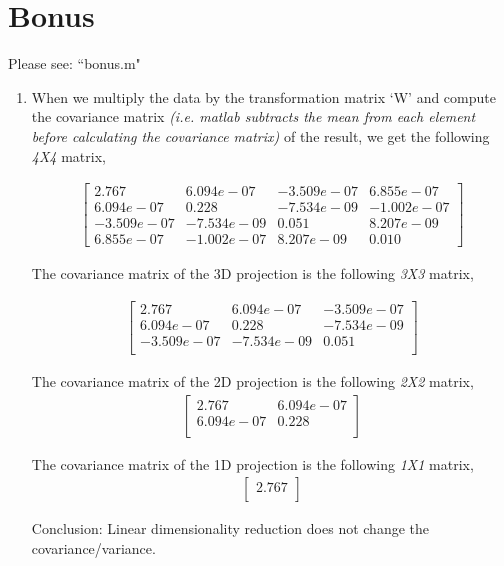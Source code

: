 \documentclass[a4paper]{article}
\begin{document}
\section*{Bonus}

Please see: ``bonus.m" \newline

\begin{enumerate}
	\item[] When we multiply the data by the transformation matrix `W' and compute the covariance matrix \textit{(i.e. matlab subtracts the mean from each element before calculating the covariance matrix)} of the result, we get the following \textit{4X4} matrix,

\begin{align*}
	\begin{bmatrix}
		2.767 &	6.094e-07 & -3.509e-07	& 6.855e-07 \\
		6.094e-07 & 0.228	& -7.534e-09 & -1.002e-07 \\
		-3.509e-07 & -7.534e-09 & 0.051	& 8.207e-09 \\
		6.855e-07 & -1.002e-07 & 8.207e-09 & 0.010 
	\end{bmatrix}
\end{align*}
	\newline
	
The covariance matrix of the 3D projection is the following \textit{3X3} matrix,

\begin{align*}
	\begin{bmatrix}
		2.767 &	6.094e-07 & -3.509e-07 \\
		6.094e-07 & 0.228	& -7.534e-09 \\
		-3.509e-07 & -7.534e-09 & 0.051 \\ 
	\end{bmatrix}
\end{align*}
\newline

The covariance matrix of the 2D projection is the following \textit{2X2} matrix,
\begin{align*}
	\begin{bmatrix}
		2.767 &	6.094e-07 \\
		6.094e-07 & 0.228 \\
	\end{bmatrix}
\end{align*}
\newline


The covariance matrix of the 1D projection is the following \textit{1X1} matrix,
\begin{align*}
	\begin{bmatrix}
		2.767 \\
	\end{bmatrix}
\end{align*}
\newline

Conclusion: Linear dimensionality reduction does not change the covariance/variance.

\end{enumerate}
\end{document}
